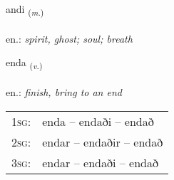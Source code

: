 \documentclass[frontgrid, backgrid]{flacards}\usepackage[]{graphicx}\usepackage[]{xcolor}
\begin{document}
\renewcommand{\flhead}{\vskip5pt \fboxsep=0pt {\small\bfseries\footnotesize Nafnorð | Noun}}
\renewcommand{\fcfoot}{\vskip5pt \fboxsep=0pt \hspace{2pt}{\small\bfseries\footnotesize 1K}}

\renewcommand{\blhead}{\vskip5pt {\small\bfseries\footnotesize Nafnorð | Noun }}
\renewcommand{\bcfoot}{\vskip5pt \hspace{2pt}{\small\bfseries\footnotesize 1K}}


{andi \small{\textsubscript{(\textit{m.})}} \\[1ex] %
\textphonetic{[antɪ]} \\
en.: \emph{spirit, ghost; soul; breath} \\  [2ex]
\renewcommand*{\arraystretch}{0.8}
}

\renewcommand{\flhead}{\vskip5pt \fboxsep=0pt {\small\bfseries\footnotesize Sagnorð | Verb}}
\renewcommand{\fcfoot}{\vskip5pt \fboxsep=0pt \hspace{2pt}{\small\bfseries\footnotesize 1K}}

\renewcommand{\blhead}{\vskip5pt {\small\bfseries\footnotesize Sagnorð | Verb }}
\renewcommand{\bcfoot}{\vskip5pt \hspace{2pt}{\small\bfseries\footnotesize 1K}}


{enda \small{\textsubscript{(\textit{v.})}} \\[1ex] %
\textphonetic{[ɛnta]} \\
en.: \emph{finish, bring to an end} \\  [2ex]
\renewcommand*{\arraystretch}{0.8}
\begin{tabular}{p{1cm}l}
\textsc{1sg}: & enda -- endaði -- endað \\ 
\textsc{2sg}: & endar -- endaðir -- endað \\ 
\textsc{3sg}: & endar -- endaði -- endað \\ 
\end{tabular}
}
\end{document}
